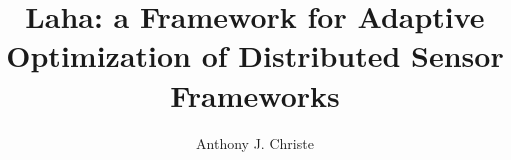 \documentclass[11pt, dissertation, proposal]{uhthesis}
\title{Laha: a Framework for Adaptive Optimization of Distributed Sensor Frameworks}
\author{Anthony J. Christe}
\begin{document}
\maketitle

\begin{frontmatter}


\copyrightpage

%

%

%

\tableofcontents

\listoftables

\listoffigures

\end{frontmatter}





%


%




%
\end{document}
